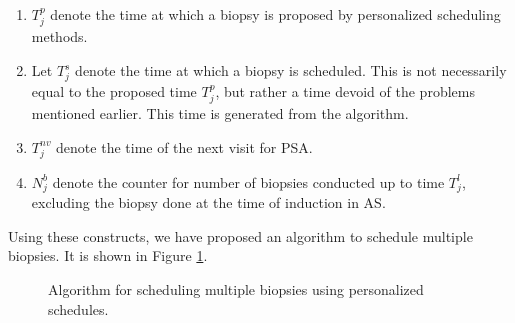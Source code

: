 \begin{enumerate}
\item $T^p_j$ denote the time at which a biopsy is proposed by personalized scheduling methods.
\item Let $T^s_j$ denote the time at which a biopsy is scheduled. This is not necessarily equal to the proposed time $T^p_j$, but rather a time devoid of the problems mentioned earlier. This time is generated from the algorithm.
\item $T^{nv}_j$ denote the time of the next visit for PSA.
\item $N^b_j$ denote the counter for number of biopsies conducted up to time $T^l_j$, excluding the biopsy done at the time of induction in AS.
\end{enumerate}
Using these constructs, we have proposed an algorithm to schedule multiple biopsies. It is shown in Figure \ref{fig : sched_algorithm}. 

\begin{figure}[!htb]
\centering
\captionsetup{justification=centering}

\caption{Algorithm for scheduling multiple biopsies using personalized schedules.} 
\label{fig : sched_algorithm}
\end{figure}